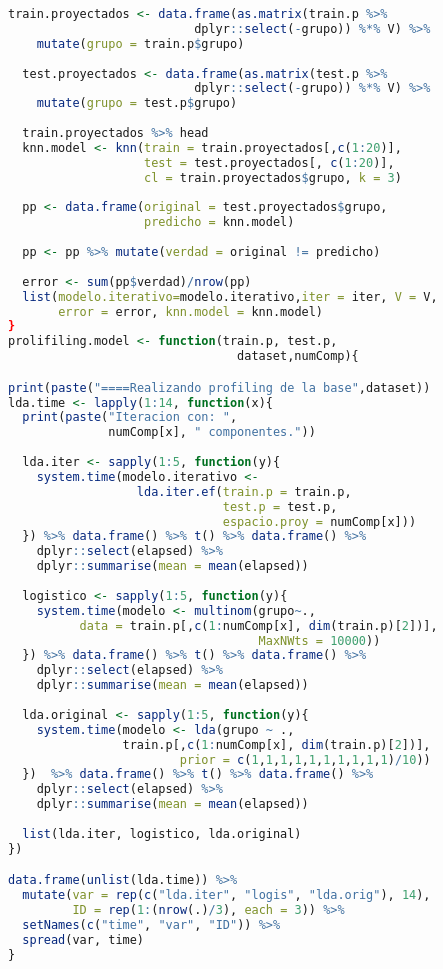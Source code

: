 \begin{lstlisting}[language=R, basicstyle=\small]
  train.proyectados <- data.frame(as.matrix(train.p %>% 
                          dplyr::select(-grupo)) %*% V) %>%
    mutate(grupo = train.p$grupo)
  
  test.proyectados <- data.frame(as.matrix(test.p %>% 
                          dplyr::select(-grupo)) %*% V) %>%
    mutate(grupo = test.p$grupo)
  
  train.proyectados %>% head
  knn.model <- knn(train = train.proyectados[,c(1:20)], 
                   test = test.proyectados[, c(1:20)], 
                   cl = train.proyectados$grupo, k = 3)
  
  pp <- data.frame(original = test.proyectados$grupo, 
                   predicho = knn.model)
  
  pp <- pp %>% mutate(verdad = original != predicho)
  
  error <- sum(pp$verdad)/nrow(pp)
  list(modelo.iterativo=modelo.iterativo,iter = iter, V = V, 
       error = error, knn.model = knn.model)
}
prolifiling.model <- function(train.p, test.p, 
                                dataset,numComp){

print(paste("====Realizando profiling de la base",dataset))
lda.time <- lapply(1:14, function(x){
  print(paste("Iteracion con: ", 
              numComp[x], " componentes."))
  
  lda.iter <- sapply(1:5, function(y){
    system.time(modelo.iterativo <- 
                  lda.iter.ef(train.p = train.p, 
                              test.p = test.p, 
                              espacio.proy = numComp[x]))
  }) %>% data.frame() %>% t() %>% data.frame() %>% 
    dplyr::select(elapsed) %>% 
    dplyr::summarise(mean = mean(elapsed))
  
  logistico <- sapply(1:5, function(y){
    system.time(modelo <- multinom(grupo~., 
          data = train.p[,c(1:numComp[x], dim(train.p)[2])], 
                                   MaxNWts = 10000))
  }) %>% data.frame() %>% t() %>% data.frame() %>% 
    dplyr::select(elapsed) %>% 
    dplyr::summarise(mean = mean(elapsed))
  
  lda.original <- sapply(1:5, function(y){
    system.time(modelo <- lda(grupo ~ .,
                train.p[,c(1:numComp[x], dim(train.p)[2])], 
                        prior = c(1,1,1,1,1,1,1,1,1,1)/10))
  })  %>% data.frame() %>% t() %>% data.frame() %>% 
    dplyr::select(elapsed) %>% 
    dplyr::summarise(mean = mean(elapsed))
  
  list(lda.iter, logistico, lda.original)
})

data.frame(unlist(lda.time)) %>% 
  mutate(var = rep(c("lda.iter", "logis", "lda.orig"), 14),
         ID = rep(1:(nrow(.)/3), each = 3)) %>% 
  setNames(c("time", "var", "ID")) %>% 
  spread(var, time)
}



\end{lstlisting}
